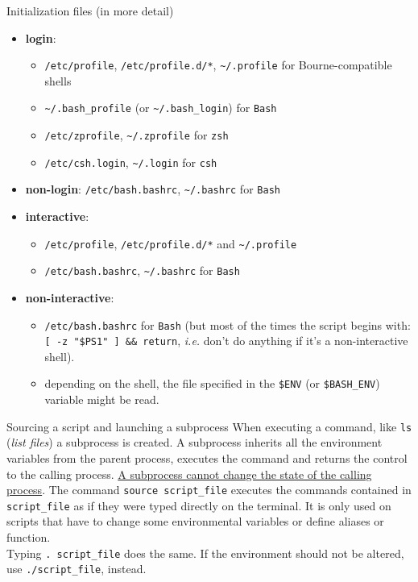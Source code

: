 \documentclass{beamer}
\begin{document}
\begin{frame}{Initialization files (in more detail)}
    \small
    \begin{itemize}
        \item \textbf{login}:
        \begin{itemize}
            \item \texttt{/etc/profile}, \texttt{/etc/profile.d/*}, \texttt{\~{}/.profile} for Bourne-compatible shells
            \item \texttt{\~{}/.bash\_profile} (or \texttt{\~{}/.bash\_login}) for \texttt{Bash}
            \item \texttt{/etc/zprofile}, \texttt{\~{}/.zprofile} for \texttt{zsh}
            \item \texttt{/etc/csh.login}, \texttt{\~{}/.login} for \texttt{csh}
        \end{itemize}        

        \item \textbf{non-login}: \texttt{/etc/bash.bashrc}, \texttt{\~{}/.bashrc} for \texttt{Bash}

        \item \textbf{interactive}:
        \begin{itemize}
            \item \texttt{/etc/profile}, \texttt{/etc/profile.d/*} and \texttt{\~{}/.profile}
            \item \texttt{/etc/bash.bashrc}, \texttt{\~{}/.bashrc} for \texttt{Bash}
        \end{itemize}

        \item \textbf{non-interactive}:
        \begin{itemize}
            \item \texttt{/etc/bash.bashrc} for \texttt{Bash} (but most of the times the script begins with: \texttt{[ -z "\$PS1" ] \&\& return}, \textit{i.e.} don't do anything if it's a non-interactive shell).
            \item depending on the shell, the file specified in the \texttt{\$ENV} (or \texttt{\$BASH\_ENV}) variable might be read.
        \end{itemize}
    \end{itemize}
\end{frame}

\begin{frame}{Sourcing a script and launching a subprocess}
When executing a command, like \texttt{ls} (\textit{list files}) a subprocess is created. A subprocess inherits all the environment variables from the parent process, executes the command and returns the control to the calling process.
\vfill
\underline{A subprocess cannot change the state of the calling process}.
\vfill
The command \texttt{source script\_file} executes the commands contained in \texttt{script\_file} as if they were typed directly on the terminal. It is only used on scripts that have to change some environmental variables or define aliases or function. \\
Typing \texttt{.\ script\_file} does the same.
\vfill
If the environment should not be altered, use \texttt{./script\_file}, instead.
\end{frame}
\end{document}
